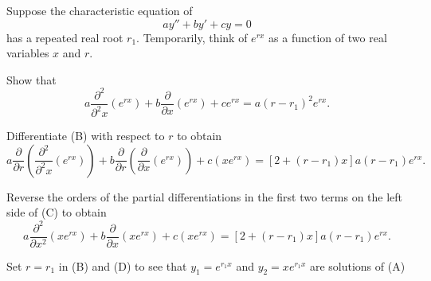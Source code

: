 \begin{exerciselist}
\item\label{exer:5.2.33}Suppose the characteristic equation of
\[
ay''+by'+cy=0
\tag{A}
\]
has a repeated real root $r_1$. Temporarily, think of $e^{rx}$
as a function of two real variables $x$ and $r$.
\begin{alist}
\item %
Show that
\[
a\frac{\partial^2}{\partial^2 x}(e^{rx})+b\frac{\partial }{\partial
x}(e^{rx}) +ce^{rx}=a(r-r_1)^2e^{rx}.
\tag{B}
\]
\item %
Differentiate (B) with respect to $r$  to obtain
\[
a\frac{\partial}{\partial r}\left(\frac{\partial^2}{\partial^2
x}(e^{rx})\right)+b\frac{\partial}{\partial r}\left(\frac{\partial}{\partial x}(e^{rx})\right)
+c(xe^{rx})=[2+(r-r_1)x]a(r-r_1)e^{rx}.
\tag{C}
\]
\item %
Reverse the orders of the partial differentiations in the first two
terms on the left side of
(C) to obtain
\[
a\frac{\partial^2}{\partial x^2}(xe^{rx})+b\frac{\partial}{\partial
x}(xe^{rx})+c(xe^{rx})=[2+(r-r_1)x]a(r-r_1)e^{rx}.
\tag{D}
\]
\item %
Set $r=r_1$ in (B) and (D)
to see that $y_1=e^{r_1x}$ and $y_2=xe^{r_1x}$ are solutions
of (A)
\end{alist}


\end{exerciselist}
